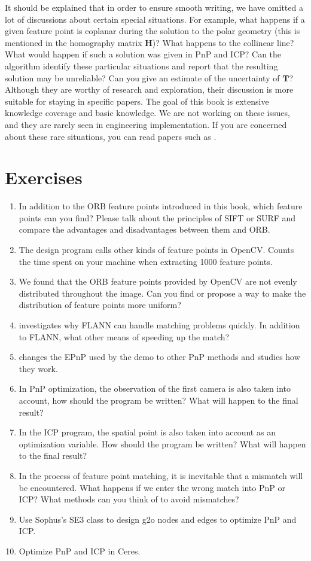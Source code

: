 It should be explained that in order to ensure smooth writing, we have omitted a lot of discussions about certain special situations. For example, what happens if a given feature point is coplanar during the solution to the polar geometry (this is mentioned in the homography matrix $\bm{H}$)? What happens to the collinear line? What would happen if such a solution was given in PnP and ICP? Can the algorithm identify these particular situations and report that the resulting solution may be unreliable? Can you give an estimate of the uncertainty of $\bm{T}$? Although they are worthy of research and exploration, their discussion is more suitable for staying in specific papers. The goal of this book is extensive knowledge coverage and basic knowledge. We are not working on these issues, and they are rarely seen in engineering implementation. If you are concerned about these rare situations, you can read papers such as \cite{Hartley2003}.

\section*{ Exercises}
\begin{enumerate}
	\item In addition to the ORB feature points introduced in this book, which feature points can you find? Please talk about the principles of SIFT or SURF and compare the advantages and disadvantages between them and ORB.
	\item The design program calls other kinds of feature points in OpenCV. Counts the time spent on your machine when extracting 1000 feature points.
	\item[\optional] We found that the ORB feature points provided by OpenCV are not evenly distributed throughout the image. Can you find or propose a way to make the distribution of feature points more uniform?
	\item investigates why FLANN can handle matching problems quickly. In addition to FLANN, what other means of speeding up the match?
	\item changes the EPnP used by the demo to other PnP methods and studies how they work.
	\item In PnP optimization, the observation of the first camera is also taken into account, how should the program be written? What will happen to the final result?
	\item In the ICP program, the spatial point is also taken into account as an optimization variable. How should the program be written? What will happen to the final result?
	\item[\optional] In the process of feature point matching, it is inevitable that a mismatch will be encountered. What happens if we enter the wrong match into PnP or ICP? What methods can you think of to avoid mismatches?
	\item[\optional] Use Sophus's SE3 class to design g2o nodes and edges to optimize PnP and ICP.
	\item[\optional] Optimize PnP and ICP in Ceres.
\end{enumerate}